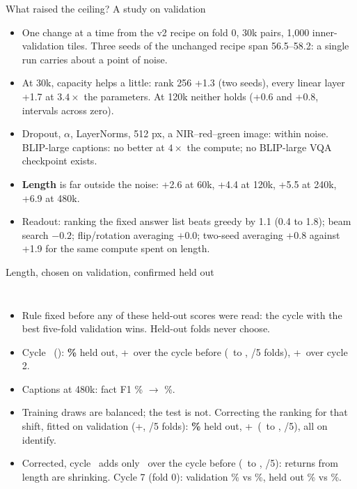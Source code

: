 \documentclass[aspectratio=169,10pt,t]{beamer}
\begin{document}
\begin{frame}{What raised the ceiling? A study on validation}
\begin{itemize}
\item One change at a time from the v2 recipe on fold 0, 30k pairs, 1,000 inner-validation tiles. Three seeds of the unchanged recipe span 56.5--58.2: a single run carries about a point of noise.
\item At 30k, capacity helps a little: rank 256 +1.3 (two seeds), every linear layer +1.7 at $3.4\times$ the parameters. At 120k neither holds (+0.6 and +0.8, intervals across zero).
\item Dropout, $\alpha$, LayerNorms, 512 px, a NIR--red--green image: within noise. BLIP-large captions: no better at $4\times$ the compute; no BLIP-large VQA checkpoint exists.
\item \textbf{Length} is far outside the noise: +2.6 at 60k, +4.4 at 120k, +5.5 at 240k, +6.9 at 480k.
\item Readout: ranking the fixed answer list beats greedy by 1.1 (0.4 to 1.8); beam search $-0.2$; flip/rotation averaging $+0.0$; two-seed averaging +0.8 against +1.9 for the same compute spent on length.
\end{itemize}
\end{frame}

\begin{frame}{Length, chosen on validation, confirmed held out}
\begin{columns}[T]
\resizebox{\textwidth}{!}{}
\vspace{1pt}
\begin{itemize}\small\setlength{\itemsep}{0pt}
\item Rule fixed before any of these held-out scores were read: the cycle with the best five-fold validation wins. Held-out folds never choose.
\item Cycle \finalCycle\ (\finalPairs): \textbf{\blipMean\%} held out, +\finalChange\ over the cycle before (\finalChangeLo\ to \finalChangeHi, \finalChangeFolds/5 folds), +\totalChange\ over cycle 2.
\item Captions at 480k: fact F1 \vtwoFactF\% $\to$ \blipFactF\%.
\item Training draws are balanced; the test is not. Correcting the ranking for that shift, fitted on validation (+\corrValChange, \corrValFolds/5 folds): \textbf{\blipCorrMean\%} held out, +\corrChange\ (\corrChangeLo\ to \corrChangeHi, \corrChangeFolds/5), all on identify.
\item Corrected, cycle \finalCycle\ adds only \corrStep\ over the cycle before (\corrStepLo\ to \corrStepHi, \corrStepFolds/5): returns from length are shrinking. Cycle 7 (fold 0): validation \sevenVal\% vs \sixValZero\%, held out \sevenHeldZero\% vs \sixHeldZero\%.
\end{itemize}
\end{columns}
\end{frame}
\end{document}
